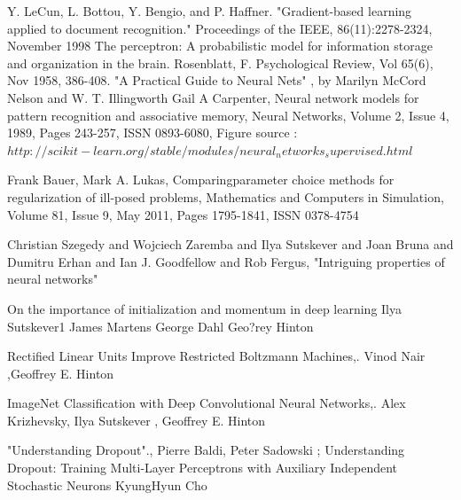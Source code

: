 \documentclass[conference]{IEEEtran}
\begin{document}
\begin{thebibliography}{1}
Y. LeCun, L. Bottou, Y. Bengio, and P. Haffner. "Gradient-based learning applied to document recognition." Proceedings of the IEEE, 86(11):2278-2324, November 1998
The perceptron: A probabilistic model for information storage and organization in the brain.
Rosenblatt, F.
Psychological Review, Vol 65(6), Nov 1958, 386-408.
"A Practical Guide to Neural Nets" , by Marilyn McCord Nelson
and W. T. Illingworth
Gail A Carpenter, Neural network models for pattern recognition and associative memory, Neural Networks, Volume 2, Issue 4, 1989, Pages 243-257, ISSN 0893-6080, 
Figure source : $http://scikit-learn.org/stable/modules/neural_networks_supervised.html$

Frank Bauer, Mark A. Lukas, Comparingparameter choice methods for regularization of ill-posed problems, Mathematics and Computers in Simulation, Volume 81, Issue 9, May 2011, Pages 1795-1841, ISSN 0378-4754

 Christian Szegedy and
               Wojciech Zaremba and
               Ilya Sutskever and
               Joan Bruna and
               Dumitru Erhan and
               Ian J. Goodfellow and
               Rob Fergus,
 "Intriguing properties of neural networks"


On the importance of initialization and momentum in deep learning
Ilya Sutskever1
James Martens
George Dahl 
Geo?rey Hinton

Rectified Linear Units Improve Restricted Boltzmann Machines,. Vinod Nair ,Geoffrey E. Hinton

ImageNet Classification with Deep Convolutional Neural Networks,. Alex Krizhevsky, Ilya Sutskever , Geoffrey E. Hinton

"Understanding Dropout"., Pierre Baldi, Peter Sadowski ; Understanding Dropout:
Training Multi-Layer Perceptrons
with Auxiliary Independent Stochastic Neurons
KyungHyun Cho

\end{thebibliography}

\clearpage
\newpage
\onecolumn
\end{document}
